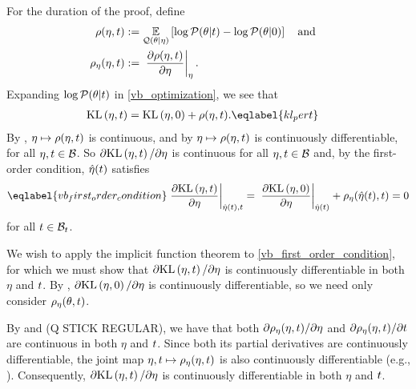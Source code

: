 %
For the duration of the proof, define
%
\begin{align*}
%
\rho(\eta, \t) :={}&
    \expect{\q(\theta \vert \eta)}
           {\log \p(\theta \vert \t) - \log \p(\theta \vert 0)}
\mathand\\
\rho_\eta(\eta, \t) :={}&
\fracat{\partial \rho(\eta, \t)}
       {\partial \eta}{\eta}.
%
\end{align*}
%
Expanding $\log \mathcal{P}(\theta \vert t)$ in \eqref{vb_optimization}, we see that
%
\begin{align}
%
\KL{\eta, \t} ={}&
    \KL{\eta, 0} + \rho(\eta, \t). \eqlabel{kl_pert}
%
\end{align}
%
%
By , $\eta \mapsto \rho(\eta, t)$ is continuous, and
by  $\eta \mapsto \rho(\eta, t)$ is continuously
differentiable, for all $\eta, t \in \mathcal{B}$.  So $\partial \mathrm{KL}\left(\eta, t\right)  /
\partial \eta$ is continuous for all $\eta, t \in \mathcal{B}$ and, by the
first-order condition, $\hat\eta(t)$ satisfies
%
\begin{align}\eqlabel{vb_first_order_condition}
%
\fracat{\partial \KL{\eta, \t}}{ \partial \eta}{\etaopt(\t), \t} ={}
\fracat{\partial \KL{\eta, 0}}{ \partial \eta}{\etaopt(\t)}
+  \rho_\eta(\etaopt(\t), \t) ={} 0
%
\end{align}
%
for all $t \in \mathcal{B}_t$.

We wish to apply the implicit function theorem to
\eqref{vb_first_order_condition}, for which we must show that $\partial
\mathrm{KL}\left(\eta, t\right) / \partial \eta$ is continuously differentiable in both $\eta$ and
$t$.  By , $\partial \mathrm{KL}\left(\eta, 0\right) /
\partial \eta$ is continuously differentiable, so we need only consider
$\rho_\eta(\theta, t)$.

By  and (Q STICK REGULAR), we
have that both $\partial \rho_\eta(\eta, t) / \partial \eta$ and $\partial
\rho_\eta(\eta, t) / \partial t$ are continuous in both $\eta$ and $t$.
Since both its partial derivatives are continuously differentiable, the joint
map $\eta, t \mapsto \rho_\eta(\eta, t)$ is also continuously differentiable
(e.g., \citet[Theorem 3.2]{fleming:2012:functions}).  Consequently, $\partial
\mathrm{KL}\left(\eta, t\right) / \partial \eta$ is continuously differentiable in both $\eta$ and
$t$.

